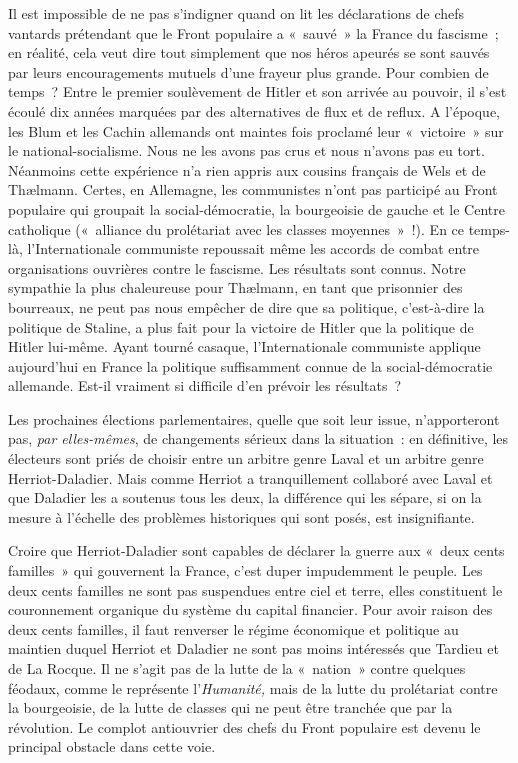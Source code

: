 \documentclass[french,twoside]{book} %
\begin{document}
Il est impossible de ne pas s’indigner quand on lit les déclarations de chefs vantards prétendant que le Front populaire a « sauvé » la France du fascisme ; en réalité, cela veut dire tout simplement que nos héros apeurés se sont sauvés par leurs encouragements mutuels d’une frayeur plus grande. Pour combien de temps ? Entre le premier soulèvement de Hitler et son arrivée au pouvoir, il s’est écoulé dix années marquées par des alternatives de flux et de reflux. A l’époque, les Blum et les Cachin allemands ont maintes fois proclamé leur « victoire » sur le national-socialisme. Nous ne les avons pas crus et nous n’avons pas eu tort. Néanmoins cette expérience n’a rien appris aux cousins français de Wels et de Thælmann. Certes, en Allemagne, les communistes n’ont pas participé au Front populaire qui groupait la social-démocratie, la bourgeoisie de gauche et le Centre catholique (« alliance du prolétariat avec les classes moyennes » !). En ce temps-là, l’Internationale communiste repoussait même les accords de combat entre organisations ouvrières contre le fascisme. Les résultats sont connus. Notre sympathie la plus chaleureuse pour Thælmann, en tant que prisonnier des bourreaux, ne peut pas nous empêcher de dire que sa politique, c’est-à-dire la politique de Staline, a plus fait pour la victoire de Hitler que la politique de Hitler lui-même. Ayant tourné casaque, l’Internationale communiste applique aujourd’hui en France la politique  suffisamment connue de la social-démocratie allemande. Est-il vraiment si difficile d’en prévoir les résultats ?\par
Les prochaines élections parlementaires, quelle que soit leur issue, n’apporteront pas, \emph{par elles-mêmes}, de changements sérieux dans la situation : en définitive, les électeurs sont priés de choisir entre un arbitre genre Laval et un arbitre genre Herriot-Daladier. Mais comme Herriot a tranquillement collaboré avec Laval et que Daladier les a soutenus tous les deux, la différence qui les sépare, si on la mesure à l’échelle des problèmes historiques qui sont posés, est insignifiante.\par
Croire que Herriot-Daladier sont capables de déclarer la guerre aux « deux cents familles » qui gouvernent la France, c’est duper impudemment le peuple. Les deux cents familles ne sont pas suspendues entre ciel et terre, elles constituent le couronnement organique du système du capital financier. Pour avoir raison des deux cents familles, il faut renverser le régime économique et politique au maintien duquel Herriot et Daladier ne sont pas moins intéressés que Tardieu et de La Rocque. Il ne s’agit pas de la lutte de la « nation » contre quelques féodaux, comme le représente l’\emph{Humanité,} mais de la lutte du prolétariat contre la bourgeoisie, de la lutte de classes qui ne peut être tranchée que par la révolution. Le complot antiouvrier des chefs du Front populaire est devenu le principal obstacle dans cette voie.\par
\end{document}
